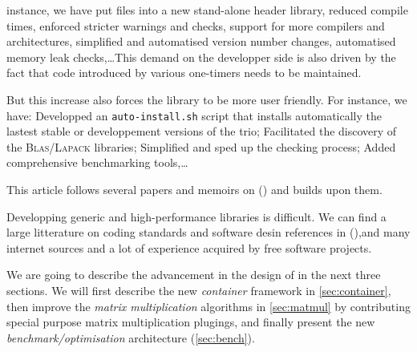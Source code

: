 instance, we have put \fflas files into a new stand-alone \fflas header
library, reduced compile times, enforced stricter warnings and checks, support
for more compilers and architectures, simplified and automatised version number
changes, automatised memory leak checks,\dots This demand on the developper
side is also driven by the fact that code introduced by various one-timers
needs to be maintained.
%
\par
%
But this increase also forces the library to be more user friendly. For
instance, we have: Developped an \texttt{auto-install.sh} script that installs
automatically the lastest stable or developpement versions of the trio;
Facilitated the discovery of the \textsc{Blas}/\textsc{Lapack} libraries;
Simplified and sped up the checking process; Added comprehensive benchmarking tools,\dots
%
\par
%
This article follows several papers and memoirs on \linbox
(\cite{Giorgi:2004:these,Turner:2002:these,Boyer:12,Dumas:2002:icms,Dumas:2010:lbpar})
and builds upon them.
%
\par
%
Developping generic and high-performance libraries is difficult. We can find a
large litterature on coding standards and software desin references in
(\cite{alexandrescu:01:modern,gamma:95:design,sutter:05:cpp,stroustrup1994design,Douglas:05:GPHP}),and  many internet sources and a lot of
experience acquired by free software projects.
%
\par
%
We are going to describe the advancement in the design of \linbox in the next
three sections. We will first describe the new \emph{container} framework in
\cref{sec:container}, then improve the \emph{matrix multiplication} algorithms
in \cref{sec:matmul} by contributing special purpose matrix multiplication
plugings, and finally present the new \emph{benchmark/optimisation}
architecture (\cref{sec:bench}).

